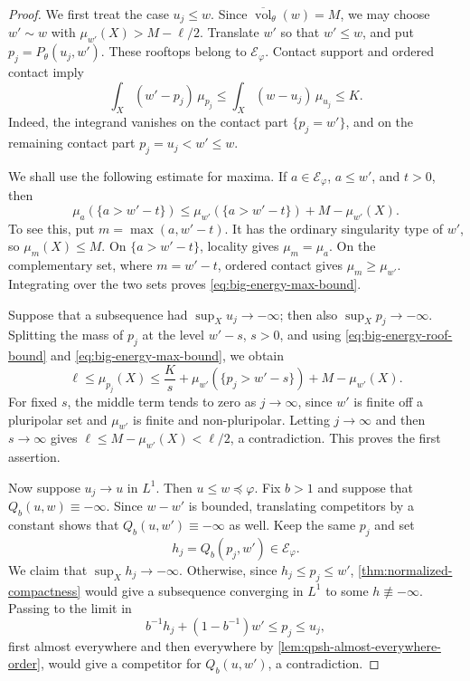 \begin{proof}
We first treat the case $u_j\leq w$. Since $\overline{\operatorname{vol}}_\theta(w)=M$, we may choose $w'\sim w$ with $\mu_{w'}(X)>M-\ell/2$. Translate $w'$ so that $w'\leq w$, and put $p_j=P_\theta(u_j,w')$. These rooftops belong to $\mathcal E_\varphi$. Contact support and ordered contact imply
\begin{equation}\label{eq:big-energy-roof-bound}
 \int_X(w'-p_j)\,\mu_{p_j}
 \leq\int_X(w-u_j)\,\mu_{u_j}\leq K.
\end{equation}
Indeed, the integrand vanishes on the contact part $\{p_j=w'\}$, and on the remaining contact part $p_j=u_j<w'\leq w$.

We shall use the following estimate for maxima. If $a\in\mathcal E_\varphi$, $a\leq w'$, and $t>0$, then
\begin{equation}\label{eq:big-energy-max-bound}
 \mu_a(\{a>w'-t\})
 \leq \mu_{w'}(\{a>w'-t\})+M-\mu_{w'}(X).
\end{equation}
To see this, put $m=\max(a,w'-t)$. It has the ordinary singularity type of $w'$, so $\mu_m(X)\leq M$. On $\{a>w'-t\}$, locality gives $\mu_m=\mu_a$. On the complementary set, where $m=w'-t$, ordered contact gives $\mu_m\geq\mu_{w'}$. Integrating over the two sets proves \eqref{eq:big-energy-max-bound}.

Suppose that a subsequence had $\sup_Xu_j\to-\infty$; then also $\sup_Xp_j\to-\infty$. Splitting the mass of $p_j$ at the level $w'-s$, $s>0$, and using \eqref{eq:big-energy-roof-bound} and \eqref{eq:big-energy-max-bound}, we obtain
\[
 \ell\leq\mu_{p_j}(X)
 \leq\frac Ks+\mu_{w'}(\{p_j>w'-s\})+M-\mu_{w'}(X).
\]
For fixed $s$, the middle term tends to zero as $j\to\infty$, since $w'$ is finite off a pluripolar set and $\mu_{w'}$ is finite and non-pluripolar. Letting $j\to\infty$ and then $s\to\infty$ gives $\ell\leq M-\mu_{w'}(X)<\ell/2$, a contradiction. This proves the first assertion.

Now suppose $u_j\to u$ in $L^1$. Then $u\leq w\preceq\varphi$. Fix $b>1$ and suppose that $Q_b(u,w)\equiv-\infty$. Since $w-w'$ is bounded, translating competitors by a constant shows that $Q_b(u,w')\equiv-\infty$ as well. Keep the same $p_j$ and set
\[
 h_j=Q_b(p_j,w')\in\mathcal E_\varphi.
\]
We claim that $\sup_Xh_j\to-\infty$. Otherwise, since $h_j\leq p_j\leq w'$, \cref{thm:normalized-compactness} would give a subsequence converging in $L^1$ to some $h\not\equiv-\infty$. Passing to the limit in
\[
 b^{-1}h_j+(1-b^{-1})w'\leq p_j\leq u_j,
\]
first almost everywhere and then everywhere by \cref{lem:qpsh-almost-everywhere-order}, would give a competitor for $Q_b(u,w')$, a contradiction.


\end{proof}
